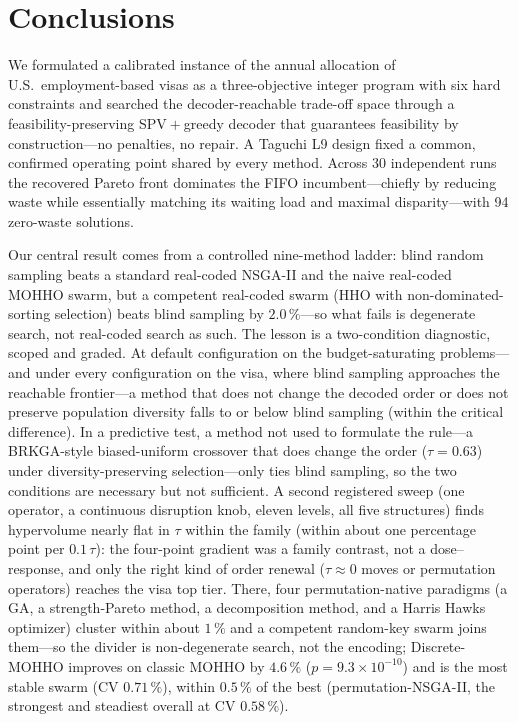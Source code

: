 \documentclass[runningheads]{llncs}
\begin{document}
\section{Conclusions}
\label{sec:conclusions}

We formulated a calibrated instance of the annual allocation of U.S.\ employment-based visas as a three-objective integer program with six hard constraints and searched the decoder-reachable trade-off space through a feasibility-preserving SPV${}+{}$greedy decoder that guarantees feasibility by construction---no penalties, no repair. A Taguchi L9 design fixed a common, confirmed operating point shared by every method. Across 30 independent runs the recovered Pareto front dominates the FIFO incumbent---chiefly by reducing waste while essentially matching its waiting load and maximal disparity---with 94 zero-waste solutions.

Our central result comes from a controlled nine-method ladder: blind random sampling beats a standard real-coded NSGA-II and the naive real-coded MOHHO swarm, but a competent real-coded swarm (HHO with non-dominated-sorting selection) beats blind sampling by $2.0\,\%$---so what fails is degenerate search, not real-coded search as such. The lesson is a two-condition diagnostic, scoped and graded. At default configuration on the budget-saturating problems---and under every configuration on the visa, where blind sampling approaches the reachable frontier---a method that does not change the decoded order or does not preserve population diversity falls to or below blind sampling (within the critical difference). In a predictive test, a method not used to formulate the rule---a BRKGA-style biased-uniform crossover that does change the order ($\tau=0.63$) under diversity-preserving selection---only ties blind sampling, so the two conditions are necessary but not sufficient. A second registered sweep (one operator, a continuous disruption knob, eleven levels, all five structures) finds hypervolume nearly flat in $\tau$ within the family (within about one percentage point per $0.1\,\tau$): the four-point gradient was a family contrast, not a dose--response, and only the right kind of order renewal ($\tau\approx0$ moves or permutation operators) reaches the visa top tier. There, four permutation-native paradigms (a GA, a strength-Pareto method, a decomposition method, and a Harris Hawks optimizer) cluster within about $1\,\%$ and a competent random-key swarm joins them---so the divider is non-degenerate search, not the encoding; Discrete-MOHHO improves on classic MOHHO by $4.6\,\%$ ($p=9.3\times10^{-10}$) and is the most stable swarm (CV $0.71\,\%$), within $0.5\,\%$ of the best (permutation-NSGA-II, the strongest and steadiest overall at CV $0.58\,\%$).
\end{document}
